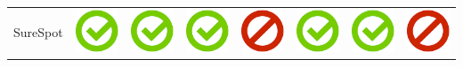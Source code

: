 \documentclass[10pt,foldmark,tumble]{leaflet}
\begin{document}
{\begin{tabular}{ L{2cm} | C{2cm} | C{2cm} | C{2cm} | C{2cm} | C{2cm} | C{2cm} | C{2cm} | }
SureSpot & \includegraphics[scale=0.1]{pics/haken.png} & \includegraphics[scale=0.1]{pics/haken.png} & \includegraphics[scale=0.1]{pics/haken.png} & \includegraphics[scale=0.1]{pics/nohaken.png} & \includegraphics[scale=0.1]{pics/haken.png} & \includegraphics[scale=0.1]{pics/haken.png} & \includegraphics[scale=0.1]{pics/nohaken.png} \tabularnewline

\end{tabular}}
\end{document}

